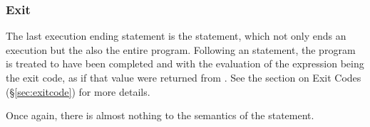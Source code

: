 \subsubsection{Exit}
\label{sec:prose-exit}

The last execution ending statement is the  statement, which not only ends
an execution but the also the entire program. Following an  statement, the
program is treated to have been completed and with the evaluation of the expression
being the exit code, as if that value were returned from . See the section
on Exit Codes (\S\ref{sec:exitcode}) for more details.

\begin{bnf*}
\end{bnf*}

Once again, there is almost nothing to the semantics of the  statement.

\begin{prooftree}
\end{prooftree}
